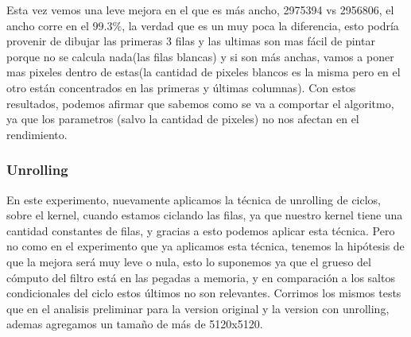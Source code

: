 Esta vez vemos una leve mejora en el que es más ancho, 2975394 vs 2956806, el ancho corre en el $99.3\%$, la verdad que es un muy poca la diferencia, esto podría provenir de dibujar las primeras 3 filas y las ultimas son mas fácil de pintar porque no se calcula nada(las filas blancas) y si son más anchas, vamos a poner mas pixeles dentro de estas(la cantidad de pixeles blancos es la misma pero en el otro están concentrados en las primeras y últimas columnas). Con estos resultados, podemos afirmar que sabemos como se va a comportar el algoritmo, ya que los parametros (salvo la cantidad de pixeles) no nos afectan en el rendimiento.

\subsubsection*{Unrolling}

En este experimento, nuevamente aplicamos la técnica de unrolling de ciclos, sobre el kernel, cuando estamos ciclando las filas, ya que nuestro kernel tiene una cantidad constantes de filas, y gracias a esto podemos aplicar esta técnica. Pero no como en el experimento que ya aplicamos esta técnica, tenemos la hipótesis de que la mejora será muy leve o nula, esto lo suponemos ya que el grueso del cómputo del filtro está en las pegadas a memoria, y en comparación a los saltos condicionales del ciclo estos últimos no son relevantes. Corrimos los mismos tests que en el analisis preliminar para la version original y la version con unrolling, ademas agregamos un tamaño de más de 5120x5120.

